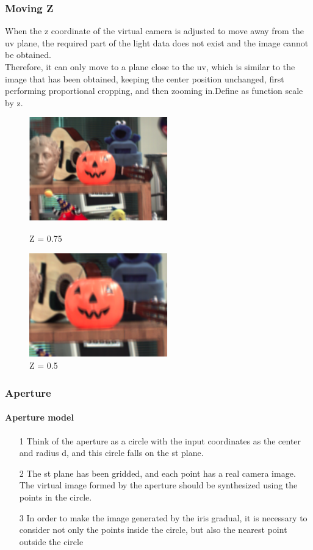 \documentclass[letterpaper,12pt]{article}
\begin{document}
\subsubsection{Moving Z}
When the z coordinate of the virtual camera is adjusted to move away from the uv plane, the required part of the light data does not exist and the image cannot be obtained. 
\\
Therefore, it can only move to a plane close to the uv, which is similar to the image that has been obtained, keeping the center position unchanged, first performing proportional cropping, and then zooming in.Define as function scale by z.

\begin{figure}[htbp]
	\centering
	\begin{minipage}[t]{0.48\textwidth}
		\centering
		\includegraphics[width=6cm]{Image/0.75.png}
		\caption{Z = 0.75}
	\end{minipage}
	\begin{minipage}[t]{0.48\textwidth}
		\centering
		\includegraphics[width=6cm]{Image/0.5.png}
		\caption{Z = 0.5}
	\end{minipage}
\end{figure}

\subsubsection{Aperture}
\paragraph{Aperture model}
\begin{itemize}
	\item[1]Think of the aperture as a circle with the input coordinates as the center and radius d, and this circle falls on the st plane.
	\item[2]The st plane has been gridded, and each point has a real camera image. The virtual image formed by the aperture should be synthesized using the points in the circle.
	\item[3]In order to make the image generated by the iris gradual, it is necessary to consider not only the points inside the circle, but also the nearest point outside the circle
\end{itemize}
\end{document}
